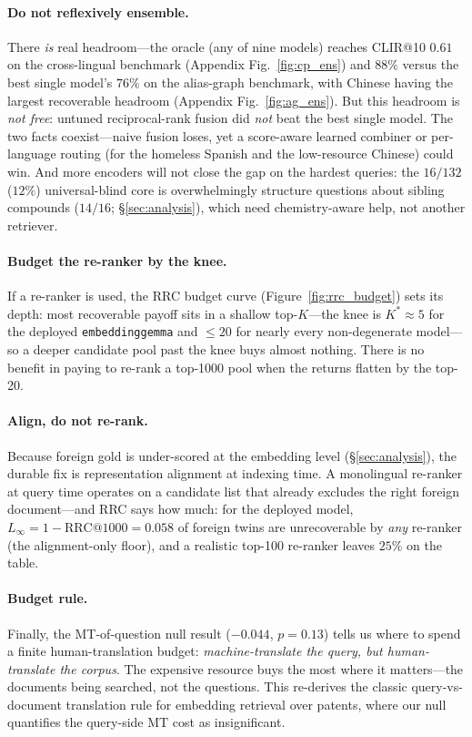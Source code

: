 \documentclass[11pt]{article}
\begin{document}
\paragraph{Do not reflexively ensemble.}
There \emph{is} real headroom---the oracle (any of nine models) reaches CLIR@10
$0.61$ on the cross-lingual benchmark (Appendix Fig.~\ref{fig:cp_ens}) and $88\%$
versus the best single model's $76\%$ on the alias-graph benchmark, with Chinese
having the largest recoverable headroom (Appendix Fig.~\ref{fig:ag_ens}). But this
headroom is \emph{not free}: untuned reciprocal-rank fusion \citep{rrf2009} did
\emph{not} beat the best single model. The two facts coexist---naive fusion
loses, yet a score-aware learned combiner or per-language routing (for the
homeless Spanish and the low-resource Chinese) could win. And more encoders will
not close the gap on the hardest queries: the $16/132$ ($12\%$) universal-blind
core is overwhelmingly structure questions about sibling compounds ($14/16$;
\S\ref{sec:analysis}), which need chemistry-aware help, not another retriever.

\paragraph{Budget the re-ranker by the knee.}
If a re-ranker is used, the RRC budget curve (Figure~\ref{fig:rrc_budget}) sets
its depth: most recoverable payoff sits in a shallow top-$K$---the knee is
$K^{\!*}{\approx}5$ for the deployed \texttt{embeddinggemma} and $\le 20$ for
nearly every non-degenerate model---so a deeper candidate pool past the knee buys
almost nothing. There is no benefit in paying to re-rank a top-1000 pool when the
returns flatten by the top-20.

\paragraph{Align, do not re-rank.}
Because foreign gold is under-scored at the embedding level
(\S\ref{sec:analysis}), the durable fix is representation alignment at indexing
time. A monolingual re-ranker at query time operates on a candidate list that
already excludes the right foreign document---and RRC says how much: for the
deployed model, $L_\infty = 1-\mathrm{RRC@1000}=0.058$ of foreign twins are
unrecoverable by \emph{any} re-ranker (the alignment-only floor), and a realistic
top-100 re-ranker leaves $25\%$ on the table.

\paragraph{Budget rule.}
Finally, the MT-of-question null result ($-0.044$, $p=0.13$) tells us where to
spend a finite human-translation budget: \emph{machine-translate the query, but
human-translate the corpus}. The expensive resource buys the most where it
matters---the documents being searched, not the questions. This re-derives the
classic query-vs-document translation rule \citep{oard1998,salehpecina2020} for
embedding retrieval over patents, where our null quantifies the query-side MT
cost as insignificant.
\end{document}
